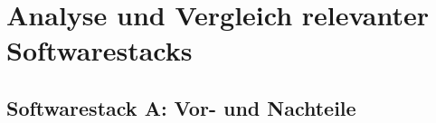 \chapter{Analyse und Vergleich relevanter Softwarestacks}\label{sec:stack-a}
\section{Softwarestack A: Vor- und Nachteile}